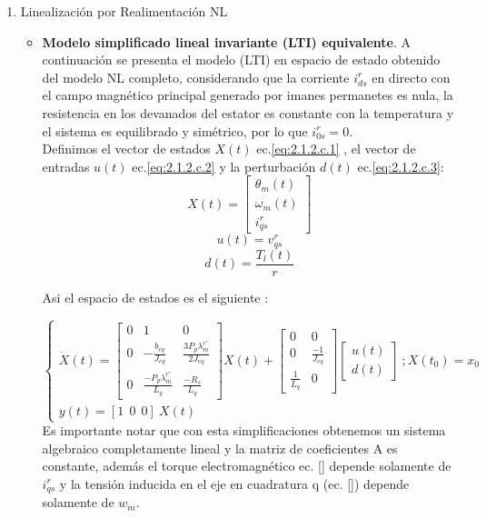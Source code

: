 \documentclass[10pt]{article}
\begin{document}
\begin{enumerate}
    \item Linealización por Realimentación NL
    \begin{itemize}
    
	\item\textbf{ Modelo simplificado lineal invariante (LTI) equivalente}.
	A continuación se presenta el modelo (LTI) en espacio de estado obtenido del modelo NL completo, considerando que la corriente  		$i^{r}_{ds}$ en directo con el campo magnético principal generado por imanes permanetes es nula, la resistencia en los 			devanados del estator es constante con la temperatura y el sistema es equilibrado y simétrico, por lo que  $i^{r}_{0s}=0$.\\
	Definimos el vector de estados $X(t)$ ec.\ref{eq:2.1.2.c.1} , el vector de entradas $u(t)$ ec.\ref{eq:2.1.2.c.2} y la perturbación 	$d(t)$ ec.\ref{eq:2.1.2.c.3}:
	\begin{equation}
	X(t)=\begin{bmatrix}
	\theta_{m}(t)\\
	\omega_{m}(t) 
	\\ 
	i^{r}_{qs}
	\end{bmatrix}
	\label{eq:2.1.2.c.1}
	\end{equation}
	\begin{equation}
	u(t)=v^{r}_{qs} 
	\label{eq:2.1.2.c.2}
	\end{equation}
	\begin{equation}
	d(t)=\frac{T_{l}(t)}{r} 
	\label{eq:2.1.2.c.3}
	\end{equation}
	
	Asi el espacio de estados es el siguiente  :
	
	\begin{equation}
	\begin{cases}
	\dot{X}(t)=\begin{bmatrix}
	0 & 1 &0 \\ 
	0 & -\frac{b_{eq}}{J_{eq}} & \frac{3 P_{p} \lambda^{r'}_{m}}{2 J_{eq}} \\ 
	0  & \frac{- P_{p} \lambda^{r'}_{m}}{ L_{q}} & \frac{-R_{s}}{L_{q}}
	\end{bmatrix} X(t) + \begin{bmatrix}
	0 &0 \\ 
	0 &\frac{-1}{J_{eq}} \\ 
	 \frac{1}{L_{q}}&0 
	\end{bmatrix} \begin{bmatrix}
	u(t)\\
	d(t) 
	
	\end{bmatrix} \ ; X(t_{0})=x_{0}\\ 
	y(t)=[1 \ \ 0 \ \ 0 ] \ X(t)
	\end{cases}
	\label{eq:2.1.2.c.4}
	\end{equation}
	Es importante notar que con esta simplificaciones obtenemos un sistema algebraico completamente lineal y la matriz de 				coeficientes A es constante, además el torque electromagnético ec. \ref{} depende solamente de $i^{r}_{qs}$ y la tensión 			inducida en el eje en cuadratura q (ec. \ref{}) depende solamente de $w_{m}$.
	

\end{itemize}
\end{enumerate}
\end{document}
